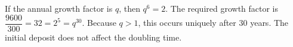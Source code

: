 If the annual growth factor is $q$, then $q^6=2$. The required growth factor is $\dfrac{9600}{300}=32=2^5=q^{30}$. Because $q>1$, this occurs uniquely after $\boxed{30}$ years. The initial deposit does not affect the doubling time.

